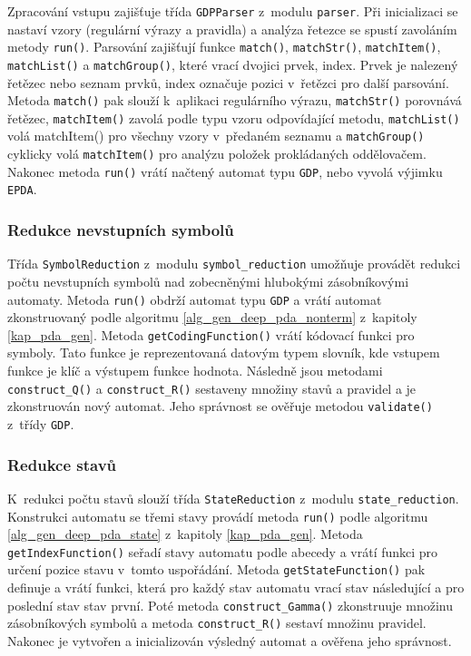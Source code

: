 Zpracování vstupu zajišťuje třída \texttt{GDPParser} z~modulu \texttt{parser}. 
Při inicializaci se nastaví vzory (regulární výrazy a pravidla) a analýza řetezce se spustí zavoláním metody \texttt{run()}. Parsování zajišťují funkce \texttt{match()}, \texttt{matchStr()}, \texttt{matchItem()}, \texttt{matchList()} a \texttt{matchGroup()}, které vrací dvojici prvek, index. Prvek je nalezený řetězec nebo seznam prvků, index označuje pozici v~řetězci pro další parsování. Metoda \texttt{match()} pak slouží k~aplikaci regulárního výrazu, \texttt{matchStr()} porovnává řetězec, \texttt{matchItem()} zavolá podle typu vzoru odpovídající metodu, \texttt{matchList()} volá matchItem() pro všechny vzory v~předaném seznamu a \texttt{matchGroup()} cyklicky volá \texttt{matchItem()} pro analýzu položek prokládaných oddělovačem. Nakonec metoda \texttt{run()} vrátí načtený automat typu \texttt{GDP}, nebo vyvolá výjimku \texttt{EPDA}.

\subsubsection{Redukce nevstupních symbolů}

Třída \texttt{SymbolReduction} z~modulu \texttt{symbol\_reduction} umožňuje provádět redukci počtu nevstupních symbolů nad zobecněnými hlubokými zásobníkovými automaty. Metoda \texttt{run()} obdrží automat typu \texttt{GDP} a vrátí automat zkonstruovaný podle algoritmu \ref{alg_gen_deep_pda_nonterm} z~kapitoly \ref{kap_pda_gen}.
Metoda \texttt{getCodingFunction()} vrátí kódovací funkci pro symboly. Tato funkce je reprezentovaná datovým typem slovník, kde vstupem funkce je klíč a výstupem funkce hodnota. Následně jsou metodami \texttt{construct\_Q()} a \texttt{construct\_R()} sestaveny množiny stavů a pravidel a je zkonstruován nový automat. Jeho správnost se ověřuje metodou \texttt{validate()} z~třídy \texttt{GDP}.

\subsubsection{Redukce stavů}

K~redukci počtu stavů slouží třída \texttt{StateReduction} z~modulu \texttt{state\_reduction}. Konstrukci automatu se třemi stavy provádí metoda \texttt{run()} podle algoritmu \ref{alg_gen_deep_pda_state} z~kapitoly \ref{kap_pda_gen}. Metoda \texttt{getIndexFunction()} seřadí stavy automatu podle abecedy a vrátí funkci pro určení pozice stavu v~tomto uspořádání. Metoda \texttt{getStateFunction()} pak definuje a vrátí funkci, která pro každý stav automatu vrací stav následující a pro poslední stav stav první. Poté metoda \texttt{construct\_Gamma()} zkonstruuje množinu zásobníkových symbolů a metoda \texttt{construct\_R()} sestaví množinu pravidel. Nakonec je vytvořen a inicializován výsledný automat a ověřena jeho správnost.

